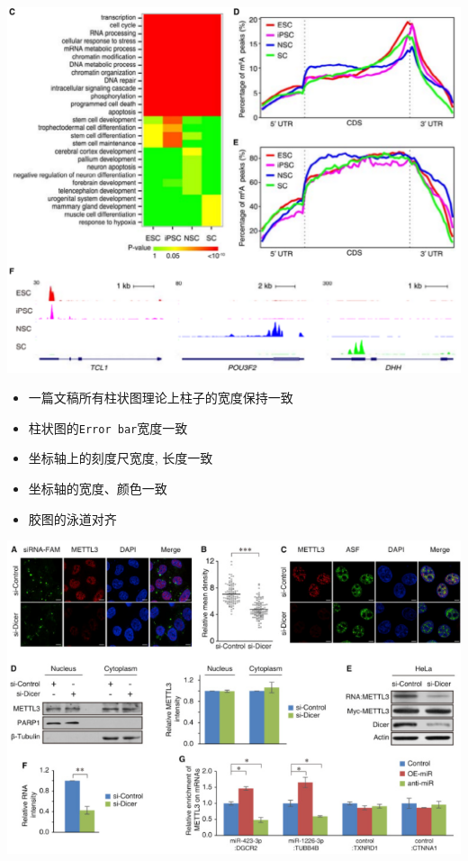 \documentclass[]{article}
\providecommand{\tightlist}{%
  \setlength{\itemsep}{0pt}\setlength{\parskip}{0pt}}
\numberwithin{figure}{section}
\numberwithin{table}{section}
\theoremstyle{definition}
\theoremstyle{definition}
\theoremstyle{definition}
\theoremstyle{remark}
\begin{document}
\begin{center}\includegraphics[width=0.95\linewidth,height=0.7\textheight,keepaspectratio]{images/articlePic2nd_1} \end{center}

\begin{itemize}
\tightlist
\item
  一篇文稿所有柱状图理论上柱子的宽度保持一致
\item
  柱状图的\texttt{Error\ bar}宽度一致
\item
  坐标轴上的刻度尺宽度, 长度一致
\item
  坐标轴的宽度、颜色一致
\item
  胶图的泳道对齐
\end{itemize}

\begin{center}\includegraphics[width=0.95\linewidth,height=0.7\textheight,keepaspectratio]{images/articlePic2nd_2} \end{center}
\end{document}
